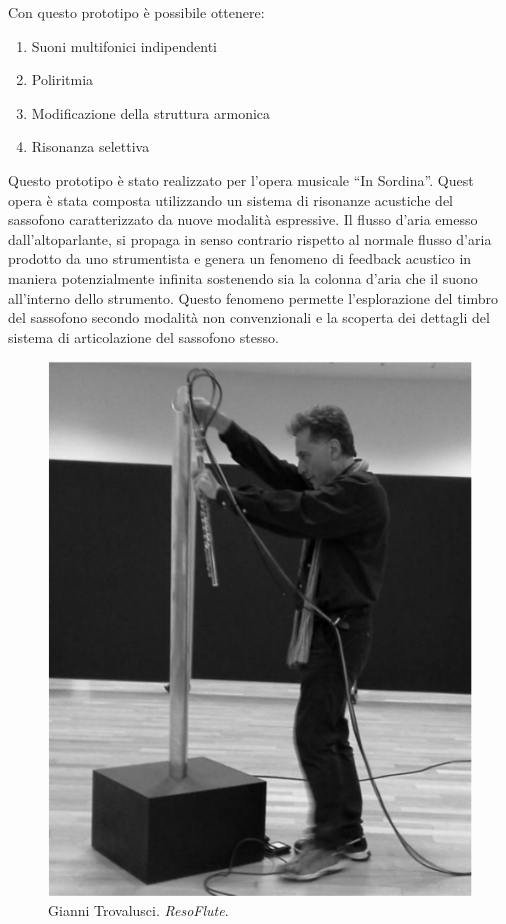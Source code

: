 Con questo prototipo è possibile ottenere:
\begin{enumerate}
  \item Suoni multifonici indipendenti
  \item Poliritmia
  \item Modificazione della struttura armonica
  \item Risonanza selettiva
\end{enumerate}

Questo prototipo è stato realizzato per l’opera musicale “In Sordina”.
Quest opera è stata composta utilizzando un sistema di risonanze acustiche del
sassofono caratterizzato da nuove modalità espressive.
Il flusso d’aria emesso dall’altoparlante, si propaga in senso contrario rispetto
al normale flusso d’aria prodotto da uno strumentista e genera un fenomeno di
feedback acustico in maniera potenzialmente infinita sostenendo sia la colonna
d’aria che il suono all’interno dello strumento.
Questo fenomeno permette l’esplorazione  del timbro del sassofono secondo
modalità non convenzionali e la scoperta dei dettagli del sistema di articolazione
del sassofono stesso. \cite{ml:aicrm}

\begin{figure}%
\centering
\includegraphics[width=0.99\columnwidth]{Graphics/foto/reso}
\caption[]{Gianni Trovalusci. \emph{ResoFlute}.}
\label{windback}
\end{figure}

